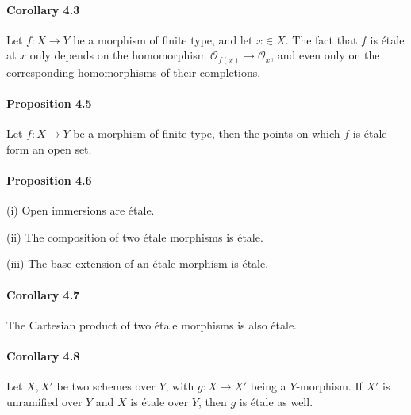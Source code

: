 \documentclass[11pt]{article}
\begin{document}
\paragraph{Corollary 4.3} Let $f:X\to Y$ be a morphism of finite type, and let $x\in X$. The fact that $f$ is étale at $x$ only depends on the homomorphism $\mathscr{O}_{f(x)}\to \mathscr{O}_x$, and even only on the corresponding homomorphisms of their completions.

\paragraph{Proposition 4.5} Let $f:X\to Y$ be a morphism of finite type, then the points on which $f$ is étale form an open set.

\paragraph{Proposition 4.6} (i) Open immersions are étale.

(ii) The composition of two étale morphisms is étale.

(iii) The base extension of an étale morphism is étale.

\paragraph{Corollary 4.7} The Cartesian product of two étale morphisms is also étale.

\paragraph{Corollary 4.8} Let $X,X'$ be two schemes over $Y$, with $g:X\to X'$ being a $Y$-morphism. If $X'$ is unramified over $Y$ and $X$ is étale over $Y$, then $g$ is étale as well.
\end{document}
